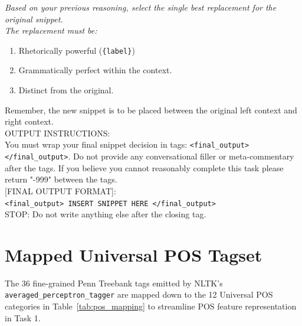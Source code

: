 \documentclass[12pt, a4paper]{article}
\begin{document}
\begin{mdframed}[backgroundcolor=gray!5, linecolor=gray!40, linewidth=0.5pt, innertopmargin=8pt, innerbottommargin=8pt]
\small\itshape
Based on your previous reasoning, select the single best replacement for the original snippet. \\
The replacement must be:
\begin{enumerate}[leftmargin=1.5em, noitemsep]
    \item Rhetorically powerful (\texttt{\{label\}})
    \item Grammatically perfect within the context.
    \item Distinct from the original.
\end{enumerate}
Remember, the new snippet is to be placed between the original left context and right context. \\[0.5em]
OUTPUT INSTRUCTIONS: \\
You must wrap your final snippet decision in tags: \texttt{<final\_output> </final\_output>}. Do not provide any conversational filler or meta-commentary after the tags. If you believe you cannot reasonably complete this task please return "-999" between the tags. \\[0.5em]
[FINAL OUTPUT FORMAT]: \\
\texttt{<final\_output> INSERT SNIPPET HERE </final\_output>} \\[0.5em]
STOP: Do not write anything else after the closing tag.
\end{mdframed}


\newpage
\section{Mapped Universal POS Tagset}
\label{app:pos_mapping}

The 36 fine-grained Penn Treebank tags emitted by NLTK's \texttt{averaged\_perceptron\_tagger} are mapped down to the 12 Universal POS categories in Table~\ref{tab:pos_mapping} to streamline POS feature representation in Task 1.
\end{document}
